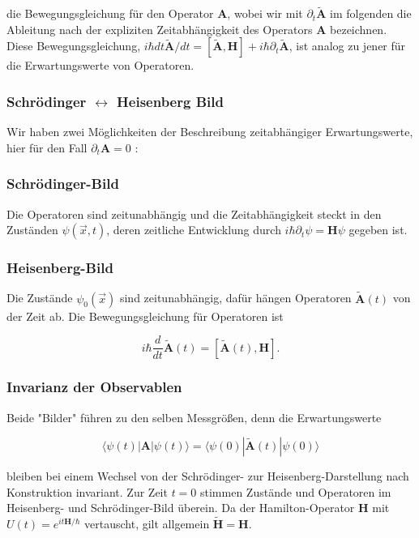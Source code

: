 \documentclass[10pt, letterpaper]{article}
\begin{document}
die Bewegungsgleichung für den Operator $\mathbf{A}$, wobei wir mit $\partial_{t} \tilde{\mathbf{A}}$ im folgenden die Ableitung nach der expliziten Zeitabhängigkeit des Operators $\mathbf{A}$ bezeichnen. Diese Bewegungsgleichung, $i \hbar d t \tilde{\mathbf{A}} / d t=[\tilde{\mathbf{A}}, \mathbf{H}]+i \hbar \partial_{t} \tilde{\mathbf{A}}$, ist analog zu jener für die Erwartungswerte von Operatoren.

\subsubsection*{Schrödinger $\leftrightarrow$ Heisenberg Bild}
Wir haben zwei Möglichkeiten der Beschreibung zeitabhängiger Erwartungswerte, hier für den Fall $\partial_{t} \mathbf{A}=0$ :

\subsubsection*{Schrödinger-Bild}
Die Operatoren sind zeitunabhängig und die Zeitabhängigkeit steckt in den Zuständen $\psi(\vec{x}, t)$, deren zeitliche Entwicklung durch $i \hbar \partial_{t} \psi=\mathbf{H} \psi$ gegeben ist.

\subsubsection*{Heisenberg-Bild}
Die Zustände $\psi_{0}(\vec{x})$ sind zeitunabhängig, dafür hängen Operatoren $\tilde{\mathbf{A}}(t)$ von der Zeit ab. Die Bewegungsgleichung für Operatoren ist

$$
i \hbar \frac{d}{d t} \tilde{\mathbf{A}}(t)=[\tilde{\mathbf{A}}(t), \mathbf{H}] .
$$

\subsubsection*{Invarianz der Observablen}
Beide "Bilder" führen zu den selben Messgrößen, denn die Erwartungswerte

$$
\langle\psi(t)| \mathbf{A}|\psi(t)\rangle=\langle\psi(0)| \tilde{\mathbf{A}}(t)|\psi(0)\rangle
$$

bleiben bei einem Wechsel von der Schrödinger- zur Heisenberg-Darstellung nach Konstruktion invariant. Zur Zeit $t=0$ stimmen Zustände und Operatoren im Heisenberg- und Schrödinger-Bild überein. Da der Hamilton-Operator $\mathbf{H}$ mit $U(t)=e^{i t \mathbf{H} / \hbar}$ vertauscht, gilt allgemein $\tilde{\mathbf{H}}=\mathbf{H}$.
\end{document}
